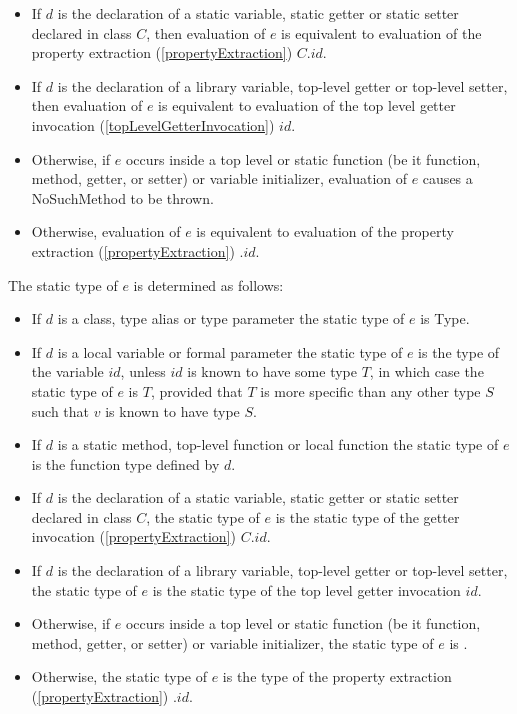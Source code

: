 \documentclass{article}
\newcommand{\code}[1]{{\sf #1}}
\begin{document}
\begin{itemize}
\item If $d$ is the declaration of a static variable, static getter or static setter declared in class $C$, then evaluation of $e$ is equivalent to evaluation of the property extraction (\ref{propertyExtraction}) $C.id$.
\item If $d$ is the declaration of a library variable, top-level getter or top-level setter, then evaluation of $e$ is equivalent to evaluation of the top level getter invocation (\ref{topLevelGetterInvocation}) $id$.
\item Otherwise, if $e$ occurs inside a top level or static function (be it function, method, getter,  or setter) or variable initializer, evaluation of $e$ causes a \code{NoSuchMethod} to be thrown.
\item Otherwise, evaluation of $e$ is equivalent to evaluation of the property extraction (\ref{propertyExtraction}) \THIS{}.$id$.
\end{itemize}

\LMHash{}
The static type of $e$ is determined as follows:

\begin{itemize}
\item If $d$ is a class, type alias or type parameter the static type of $e$ is \code{Type}.
\item If $d$ is a local variable or formal parameter the static type of $e$ is the type of the variable $id$, unless $id$ is known to have some type $T$, in which case the static type of $e$ is $T$, provided that $T$ is more specific than any other type $S$ such that $v$ is known to have type $S$.
\item If $d$ is a static method, top-level function or local function the static type of $e$ is the function type defined by $d$.
\item If $d$ is the declaration of a static variable, static getter or static setter declared in class $C$, the static type of $e$ is the static type of the getter invocation (\ref{propertyExtraction}) $C.id$.
\item If $d$ is the declaration of a library variable, top-level getter or top-level setter, the static type of $e$  is the static type of the top level getter invocation $id$.
\item Otherwise, if $e$ occurs inside a top level or static function (be it function, method, getter,  or setter) or variable initializer, the static type of $e$ is \DYNAMIC{}.
\item Otherwise, the static type of $e$ is the type of the property extraction (\ref{propertyExtraction}) \THIS{}.$id$.
\end{itemize}
\end{document}
